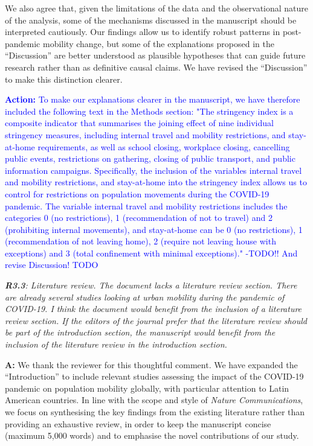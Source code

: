 \documentclass[12pt,a4paper,oneside, reqno]{amsart}
\begin{document}
We also agree that, given the limitations of the data and the observational nature of the analysis, some of the mechanisms discussed in the manuscript should be interpreted cautiously. Our findings allow us to identify robust patterns in post-pandemic mobility change, but some of the explanations proposed in the ``Discussion'' are better understood as plausible hypotheses that can guide future research rather than as definitive causal claims. We have revised the ``Discussion'' to make this distinction clearer.


\textcolor{blue}{\textbf{Action:} To make our explanations clearer in the manuscript, we have therefore included the following text in the Methods section: "The stringency index is a composite indicator that summarises the joining effect of nine individual stringency measures, including internal travel and mobility restrictions, and stay-at-home requirements, as well as school closing, workplace closing, cancelling public events, restrictions on gathering, closing of public transport,  and public information campaigns. Specifically, the inclusion of the variables internal travel and mobility restrictions, and stay-at-home into the stringency index allows us to control for restrictions on population movements during the COVID-19 pandemic. The variable internal travel and mobility restrictions includes the categories 0 (no restrictions), 1 (recommendation of not to travel) and 2 (prohibiting internal movements), and stay-at-home can be 0 (no restrictions), 1 (recommendation of not leaving home), 2 (require not leaving house with exceptions) and 3 (total confinement with minimal exceptions)." -TODO!! And revise Discussion! TODO}

\setlength{\leftskip}{0cm} \textit{\textbf{R3.3}: Literature review. The document lacks a literature review section. There are already several studies looking at urban mobility during the pandemic of COVID-19. I think the document would benefit from the inclusion of a literature review section. If the editors of the journal prefer that the literature review should be part of the introduction section, the manuscript would benefit from the inclusion of the literature review in the introduction section.}

\setlength{\leftskip}{1cm}\textbf{A:} We thank the reviewer for this thoughtful comment. We have expanded the ``Introduction'' to include relevant studies assessing the impact of the COVID-19 pandemic on population mobility globally, with particular attention to Latin American countries. In line with the scope and style of \textit{Nature Communications}, we focus on synthesising the key findings from the existing literature rather than providing an exhaustive review, in order to keep the manuscript concise (maximum 5,000 words) and to emphasise the novel contributions of our study.
\end{document}
